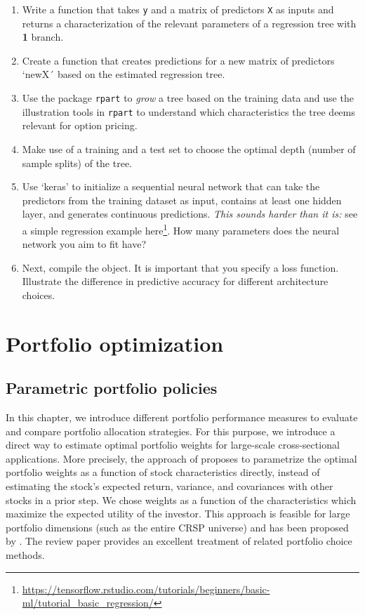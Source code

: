 \documentclass[
]{krantz}
\providecommand{\tightlist}{%
  \setlength{\itemsep}{0pt}\setlength{\parskip}{0pt}}
\renewcommand{\href}[2]{#2\footnote{\url{#1}}}
\begin{document}
\begin{enumerate}
\def\labelenumi{\arabic{enumi}.}
\tightlist
\item
  Write a function that takes \texttt{y} and a matrix of predictors \texttt{X} as inputs and returns a characterization of the relevant parameters of a regression tree with \textbf{1} branch.
\item
  Create a function that creates predictions for a new matrix of predictors `newX´ based on the estimated regression tree.
\item
  Use the package \texttt{rpart} to \emph{grow} a tree based on the training data and use the illustration tools in \texttt{rpart} to understand which characteristics the tree deems relevant for option pricing.
\item
  Make use of a training and a test set to choose the optimal depth (number of sample splits) of the tree.
\item
  Use `keras' to initialize a sequential neural network that can take the predictors from the training dataset as input, contains at least one hidden layer, and generates continuous predictions. \emph{This sounds harder than it is: }see a simple \href{https://tensorflow.rstudio.com/tutorials/beginners/basic-ml/tutorial_basic_regression/}{regression example here}. How many parameters does the neural network you aim to fit have?
\item
  Next, compile the object. It is important that you specify a loss function. Illustrate the difference in predictive accuracy for different architecture choices.
\end{enumerate}

\hypertarget{part-portfolio-optimization}{%
\part*{Portfolio optimization}\label{part-portfolio-optimization}}


\hypertarget{parametric-portfolio-policies}{%
\chapter{Parametric portfolio policies}\label{parametric-portfolio-policies}}

In this chapter, we introduce different portfolio performance measures to evaluate and compare portfolio allocation strategies.
For this purpose, we introduce a direct way to estimate optimal portfolio weights for large-scale cross-sectional applications. More precisely, the approach of \citet{Brandt2009} proposes to parametrize the optimal portfolio weights as a function of stock characteristics directly, instead of estimating the stock's expected return, variance, and covariances with other stocks in a prior step.
We chose weights as a function of the characteristics which maximize the expected utility of the investor. This approach is feasible for large portfolio dimensions (such as the entire CRSP universe) and has been proposed by \citet{Brandt2009}. The review paper \citet{Brandt2010} provides an excellent treatment of related portfolio choice methods.
\end{document}
